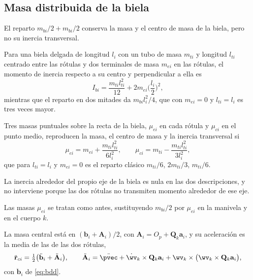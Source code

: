 
\subsection{Masa distribuida de la biela}

El reparto $m_{bi}/2+m_{bi}/2$ conserva la masa y el centro de masa de la biela, pero no su inercia transversal.

Para una biela delgada de longitud $l_i$ con un tubo de masa $m_{ti}$ y longitud $l_{ti}$ centrado entre las rótulas y dos terminales de masa $m_{ei}$ en las rótulas, el momento de inercia respecto a su centro y perpendicular a ella es
\begin{equation}
I_{bi}=\frac{m_{ti}l_{ti}^2}{12}+2m_{ei}\Big(\frac{l_i}{2}\Big)^2,
\label{eq:Ibi}
\end{equation}
mientras que el reparto en dos mitades da $m_{bi}l_i^2/4$, que con $m_{ei}=0$ y $l_{ti}=l_i$ es tres veces mayor.

Tres masas puntuales sobre la recta de la biela, $\mu_{ei}$ en cada rótula y $\mu_{ci}$ en el punto medio, reproducen la masa, el centro de masa y la inercia transversal si
\begin{equation}
\mu_{ei}=m_{ei}+\frac{m_{ti}l_{ti}^2}{6l_i^2},
\qquad
\mu_{ci}=m_{ti}-\frac{m_{ti}l_{ti}^2}{3l_i^2},
\label{eq:tresmasas}
\end{equation}
que para $l_{ti}=l_i$ y $m_{ei}=0$ es el reparto clásico $m_{ti}/6$, $2m_{ti}/3$, $m_{ti}/6$.

La inercia alrededor del propio eje de la biela es nula en las dos descripciones, y no interviene porque las dos rótulas no transmiten momento alrededor de ese eje.

Las masas $\mu_{ei}$ se tratan como antes, sustituyendo $m_{bi}/2$ por $\mu_{ei}$ en la manivela y en el cuerpo $k$.

La masa central está en $(\mathbf{b}_i+\mathbf{A}_i)/2$, con $\mathbf{A}_i=O_p+\mathbf{Q}_k\mathbf{a}_i$, y su aceleración es la media de las de las dos rótulas,
\begin{equation}
\ddot{\mathbf{r}}_{ci}=\tfrac12\big(\ddot{\mathbf{b}}_i+\ddot{\mathbf{A}}_i\big),
\qquad
\ddot{\mathbf{A}}_i=\ddot{\pvec}+\dot{\wv}_k\times\mathbf{Q}_k\mathbf{a}_i+\wv_k\times\big(\wv_k\times\mathbf{Q}_k\mathbf{a}_i\big),
\label{eq:aci}
\end{equation}
con $\ddot{\mathbf{b}}_i$ de \eqref{eq:bdd}.

